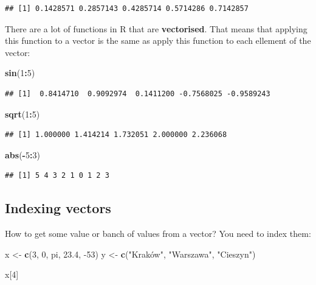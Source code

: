 \documentclass[
]{book}
\newenvironment{Shaded}{\begin{snugshade}}{\end{snugshade}}
\newcommand{\DecValTok}[1]{\textcolor[rgb]{0.00,0.00,0.81}{#1}}
\newcommand{\FloatTok}[1]{\textcolor[rgb]{0.00,0.00,0.81}{#1}}
\newcommand{\KeywordTok}[1]{\textcolor[rgb]{0.13,0.29,0.53}{\textbf{#1}}}
\newcommand{\NormalTok}[1]{#1}
\newcommand{\OperatorTok}[1]{\textcolor[rgb]{0.81,0.36,0.00}{\textbf{#1}}}
\newcommand{\StringTok}[1]{\textcolor[rgb]{0.31,0.60,0.02}{#1}}
\begin{document}
\begin{verbatim}
## [1] 0.1428571 0.2857143 0.4285714 0.5714286 0.7142857
\end{verbatim}

There are a lot of functions in R that are \textbf{vectorised}. That means that applying this function to a vector is the same as apply this function to each ellement of the vector:

\begin{Shaded}
\begin{Highlighting}[]
\KeywordTok{sin}\NormalTok{(}\DecValTok{1}\OperatorTok{:}\DecValTok{5}\NormalTok{)}
\end{Highlighting}
\end{Shaded}

\begin{verbatim}
## [1]  0.8414710  0.9092974  0.1411200 -0.7568025 -0.9589243
\end{verbatim}

\begin{Shaded}
\begin{Highlighting}[]
\KeywordTok{sqrt}\NormalTok{(}\DecValTok{1}\OperatorTok{:}\DecValTok{5}\NormalTok{)}
\end{Highlighting}
\end{Shaded}

\begin{verbatim}
## [1] 1.000000 1.414214 1.732051 2.000000 2.236068
\end{verbatim}

\begin{Shaded}
\begin{Highlighting}[]
\KeywordTok{abs}\NormalTok{(}\OperatorTok{-}\DecValTok{5}\OperatorTok{:}\DecValTok{3}\NormalTok{)}
\end{Highlighting}
\end{Shaded}

\begin{verbatim}
## [1] 5 4 3 2 1 0 1 2 3
\end{verbatim}

\hypertarget{indexing-vectors}{%
\subsection{Indexing vectors}\label{indexing-vectors}}

How to get some value or banch of values from a vector? You need to index them:

\begin{Shaded}
\begin{Highlighting}[]
\NormalTok{x <-}\StringTok{ }\KeywordTok{c}\NormalTok{(}\DecValTok{3}\NormalTok{, }\DecValTok{0}\NormalTok{, pi, }\FloatTok{23.4}\NormalTok{, }\DecValTok{-53}\NormalTok{)}
\NormalTok{y <-}\StringTok{ }\KeywordTok{c}\NormalTok{(}\StringTok{"Kraków", "}\NormalTok{Warszawa}\StringTok{", "}\NormalTok{Cieszyn}\StringTok{")}

\StringTok{x[4]}
\end{Highlighting}
\end{Shaded}
\end{document}
